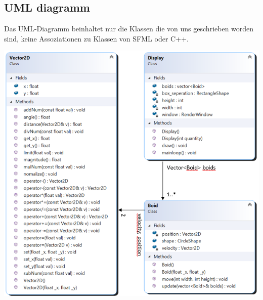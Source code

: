 \documentclass{article}
\begin{document}
        \subsection{UML diagramm}
            Das UML-Diagramm beinhaltet nur die Klassen die von uns geschrieben worden sind, keine Assoziationen zu Klassen von SFML oder C++.
            
            \includegraphics[width=15cm]{images/Class Diagramm.png}
    
    \pagebreak
    
\end{document}
